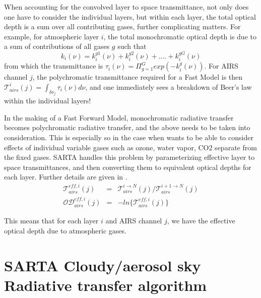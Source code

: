 \documentclass[11pt]{article}
\newcommand{\sa}{\textsf{SARTA}\xspace}
\begin{document}
When accounting for the convolved layer to space transmittance, not only does one have to consider the individual layers,
but within each layer, the total optical depth is a sum over all contributing gases, further complicating matters. 
For example, for atmospheric layer $i$, the total monochromatic optical depth is due to a sum of contributions of all 
gases $g$ such that 
\[
k_i(\nu) = k_i^{g1}(\nu) + k_i^{g2}(\nu) + .... + k_i^{gG}(\nu)
\]
from which the transmittance is $\tau_{i}(\nu) = \Pi_{g=1}^G exp(-k_i^{g}(\nu))$. For AIRS channel $j$, the polychromatic 
transmittance required for a Fast Model is then $\mathcal{T}_{airs}^{i}(j) = \int_{\delta \nu_{j}}  \tau_{i}(\nu) d\nu$, 
and one immediately sees a breakdown of Beer's law within the individual layers!

In the making of a Fast Forward Model, monochromatic radiative transfer becomes polychromatic radiative transfer, and 
the above needs to be taken into consideration. This is especially so in the case when wants to be able to consider 
effects of individual variable gases such as ozone, water vapor, CO2 separate from the fixed gases. \sa handles this 
problem by parameterizing effective layer to space transmittances, and then converting 
them to equivalent optical depths for each layer. Further details are given in \cite{han:02*1,str:02*2}.
\begin{eqnarray*}
\mathcal{T}^{eff,i}_{airs}(j) & = & \mathcal{T}_{airs}^{i \rightarrow N}(j) / \mathcal{T}_{airs}^{i+1 \rightarrow N}(j) \\
\mathcal{OD}^{eff,i}_{airs}(j) & = & -ln\{\mathcal{T}^{eff,i}_{airs}(j) \}
\end{eqnarray*}

This means that for each layer $i$ and AIRS channel $j$, we have the effective optical depth due to atmospheric gases. 

\section{SARTA Cloudy/aerosol sky Radiative transfer algorithm}
\end{document}
